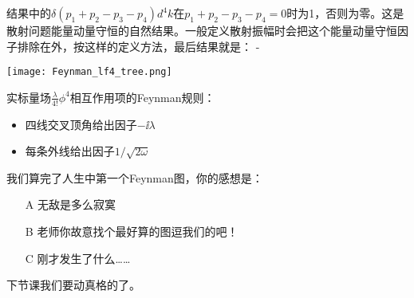 \documentclass[CJK]{beamer}
\begin{document}
\begin{frame} 
\bch
{\small
结果中的$\delta(p_1+p_2-p_3-p_4)d^4k$在$p_1+p_2-p_3-p_4=0$时为1，否则为零。这是散射问题能量动量守恒的自然结果。一般定义散射振幅时会把这个能量动量守恒因子排除在外，按这样的定义方法，最后结果就是：
\be
\calM \approx -\ii\lambda {} 
\ee
}
\ech
\end{frame}

\begin{frame} 
\bch
\begin{minipage}{0.45\textwidth}
\texttt{[image: Feynman\_lf4\_tree.png]}
\end{minipage}
\begin{minipage}{0.45\textwidth}
实标量场$\frac{\lambda}{4!}\phi^4$相互作用项的Feynman规则：
\begin{itemize}
\item{四线交叉顶角给出因子$-\ii\lambda$}
\item{每条外线给出因子$1/\sqrt{2\omega}$}
\end{itemize}
\end{minipage}

\ech
\end{frame}

\begin{frame}
\bch
我们算完了人生中第一个Feynman图，你的感想是：
\begin{itemize}
\item[A]{无敌是多么寂寞}
\item[B]{老师你故意找个最好算的图逗我们的吧！}
\item[C]{刚才发生了什么……}
\end{itemize}
\ech
\end{frame}

\begin{frame}
\bch

下节课我们要动真格的了。
\ech
\end{frame}
\end{document}
